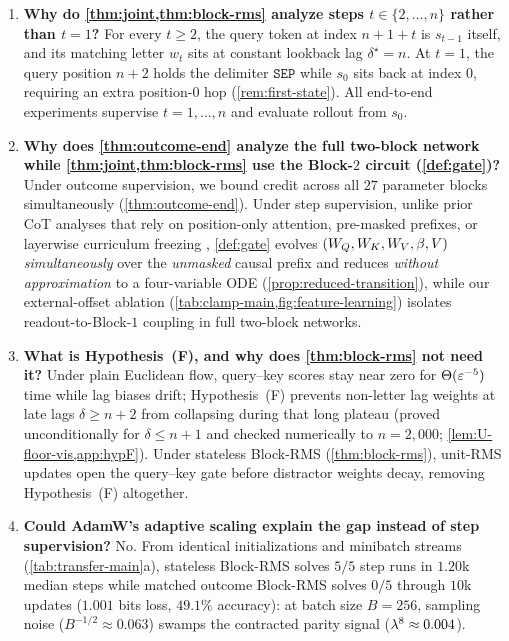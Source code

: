 \begin{enumerate}[label=\textbf{Q\arabic*.},leftmargin=*,itemsep=3pt,topsep=3pt]
\item \textbf{Why do \cref{thm:joint,thm:block-rms} analyze steps $t \in \{2,\ldots,n\}$ rather than $t = 1$?}
For every $t \ge 2$, the query token at index $n+1+t$ is $s_{t-1}$ itself, and its matching letter $w_t$ sits at constant lookback lag $\delta^\star = n$. At $t = 1$, the query position $n+2$ holds the delimiter $\mathtt{SEP}$ while $s_0$ sits back at index $0$, requiring an extra position-$0$ hop (\cref{rem:first-state}). All end-to-end experiments supervise $t = 1,\ldots,n$ and evaluate rollout from $s_0$.

\item \textbf{Why does \cref{thm:outcome-end} analyze the full two-block network while \cref{thm:joint,thm:block-rms} use the Block-$2$ circuit (\cref{def:gate})?}
Under outcome supervision, we bound credit across all $27$ parameter blocks simultaneously (\cref{thm:outcome-end}). Under step supervision, unlike prior CoT analyses that rely on position-only attention, pre-masked prefixes, or layerwise curriculum freezing \citep{kim2024parity,wen2024sparse,huang2025cotgd}, \cref{def:gate} evolves $(W_Q, W_K, W_V, \beta, V)$ \emph{simultaneously} over the \emph{unmasked} causal prefix and reduces \emph{without approximation} to a four-variable ODE (\cref{prop:reduced-transition}), while our external-offset ablation (\cref{tab:clamp-main,fig:feature-learning}) isolates readout-to-Block-$1$ coupling in full two-block networks.

\item \textbf{What is Hypothesis~(F), and why does \cref{thm:block-rms} not need it?}
Under plain Euclidean flow, query--key scores stay near zero for $\Theta(\varepsilon^{-5})$ time while lag biases drift; Hypothesis~(F) prevents non-letter lag weights at late lags $\delta \ge n+2$ from collapsing during that long plateau (proved unconditionally for $\delta \le n+1$ and checked numerically to $n = 2{,}000$; \cref{lem:U-floor-vis,app:hypF}). Under stateless Block-RMS (\cref{thm:block-rms}), unit-RMS updates open the query--key gate before distractor weights decay, removing Hypothesis~(F) altogether.

\item \textbf{Could AdamW's adaptive scaling explain the gap instead of step supervision?}
No. From identical initializations and minibatch streams (\cref{tab:transfer-main}a), stateless Block-RMS solves $5/5$ step runs in $1.20$k median steps while matched outcome Block-RMS solves $0/5$ through $10$k updates ($1.001$ bits loss, $49.1\%$ accuracy): at batch size $B = 256$, sampling noise ($B^{-1/2} \approx 0.063$) swamps the contracted parity signal ($\lambda^8 \approx 0.004$).


\end{enumerate}
